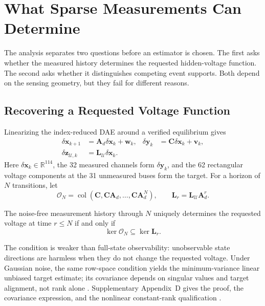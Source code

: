 \section{What Sparse Measurements Can Determine}
\label{sec:functional-observability}

The analysis separates two questions before an estimator is chosen. The first asks whether the measured history determines the requested hidden-voltage function. The second asks whether it distinguishes competing event supports. Both depend on the sensing geometry, but they fail for different reasons.

\subsection{Recovering a Requested Voltage Function}

Linearizing the index-reduced DAE around a verified equilibrium gives
\begin{align}
 \delta\bm x_{k+1}&=\bm A_d\delta\bm x_k+\bm w_k,&
 \delta\bm y_k&=\bm C\delta\bm x_k+\bm v_k,\label{eq:local-model}\\
 \delta\bm z_{\mathcal U,k}&=\bm L_{\mathcal U}\delta\bm x_k. \nonumber
\end{align}
Here $\delta\bm x_k\in\mathbb R^{114}$, the 32 measured channels form $\delta\bm y_k$, and the 62 rectangular voltage components at the 31 unmeasured buses form the target. For a horizon of $N$ transitions, let
\begin{equation}
 \mathcal O_N=\operatorname{col}(\bm C,\bm C\bm A_d,\ldots,\bm C\bm A_d^N),
 \qquad \bm L_r=\bm L_{\mathcal U}\bm A_d^r.
 \label{eq:observability-matrix}
\end{equation}

\begin{proposition}
\label{prop:functional-reconstruction}
The noise-free measurement history through $N$ uniquely determines the requested voltage at time $r\le N$ if and only if
\begin{equation}
 \ker\mathcal O_N\subseteq\ker\bm L_r.
 \label{eq:functional-condition}
\end{equation}
\end{proposition}

The condition is weaker than full-state observability: unobservable state directions are harmless when they do not change the requested voltage. Under Gaussian noise, the same row-space condition yields the minimum-variance linear unbiased target estimate; its covariance depends on singular values and target alignment, not rank alone \cite{fernando2010functional,zhang2025functional}. Supplementary Appendix~D gives the proof, the covariance expression, and the nonlinear constant-rank qualification \cite{montanari2022functional}.

